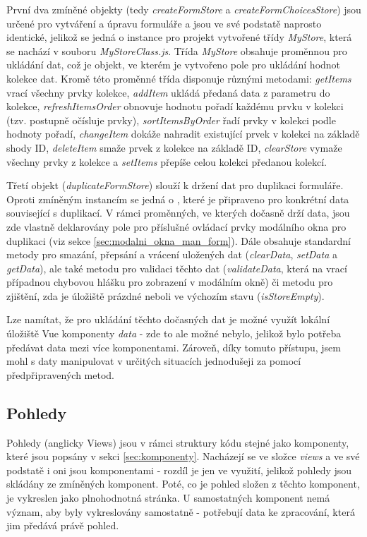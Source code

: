 		První dva zmíněné objekty (tedy \textit{createFormStore} a \textit{createFormChoicesStore}) jsou určené pro vytváření a úpravu formuláře a jsou ve své podstatě naprosto identické, jelikož se jedná o instance pro projekt vytvořené třídy \textit{MyStore}, která se nachází v souboru \textit{MyStoreClass.js}. Třída \textit{MyStore} obsahuje proměnnou pro ukládání dat, což je objekt, ve kterém je vytvořeno pole pro ukládání hodnot kolekce dat. Kromě této proměnné třída disponuje různými metodami: \textit{getItems} vrací všechny prvky kolekce, \textit{addItem} ukládá předaná data z parametru do kolekce, \textit{refreshItemsOrder} obnovuje hodnotu pořadí každému prvku v kolekci (tzv. postupně očísluje prvky), \textit{sortItemsByOrder} řadí prvky v kolekci podle hodnoty pořadí, \textit{changeItem} dokáže nahradit existující prvek v kolekci na základě shody ID, \textit{deleteItem} smaže prvek z kolekce na základě ID, \textit{clearStore} vymaže všechny prvky z kolekce a \textit{setItems} přepíše celou kolekci předanou kolekcí.
		
		Třetí objekt (\textit{duplicateFormStore}) slouží k držení dat pro duplikaci formuláře. Oproti zmíněným instancím se jedná o , které je připraveno pro konkrétní data související s duplikací. V rámci proměnných, ve kterých dočasně drží data, jsou zde vlastně deklarovány pole pro příslušné ovládací prvky modálního okna pro duplikaci (viz sekce \ref{sec:modalni_okna_man_form}). Dále obsahuje standardní metody pro smazání, přepsání a vrácení uložených dat (\textit{clearData}, \textit{setData} a \textit{getData}), ale také metodu pro validaci těchto dat (\textit{validateData}, která na vrací případnou chybovou hlášku pro zobrazení v modálním okně) či metodu pro zjištění, zda je úložiště prázdné neboli ve výchozím stavu (\textit{isStoreEmpty}).
		
		Lze namítat, že pro ukládání těchto dočasných dat je možné využít lokální úložiště Vue komponenty \textit{data} - zde to ale možné nebylo, jelikož bylo potřeba předávat data mezi více komponentami. Zároveň, díky tomuto přístupu, jsem mohl s daty manipulovat v určitých situacích jednodušeji za pomocí předpřipravených metod.
	
	\subsection{Pohledy}
	Pohledy (anglicky Views) jsou v rámci struktury kódu stejné jako komponenty, které jsou popsány v sekci \ref{sec:komponenty}. Nacházejí se ve složce \textit{views} a ve své podstatě i oni jsou komponentami - rozdíl je jen ve využití, jelikož pohledy jsou skládány ze zmíněných komponent. Poté, co je pohled složen z těchto komponent, je vykreslen jako plnohodnotná stránka. U samostatných komponent nemá význam, aby byly vykreslovány samostatně - potřebují data ke zpracování, která jim předává právě pohled. 
	
